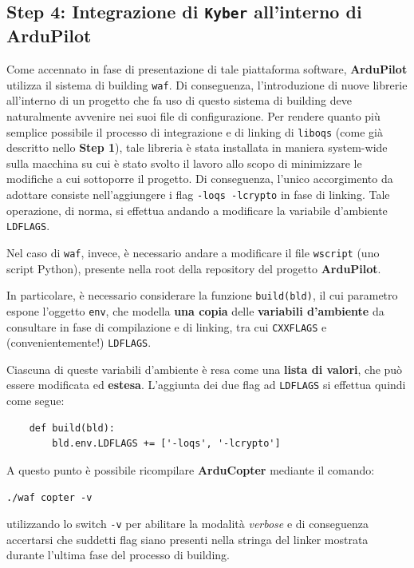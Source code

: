 \documentclass[a4paper, 12pt, oneside]{article}
\theoremstyle{definition}
\begin{document}
\subsection{Step 4: Integrazione di \texttt{Kyber} all'interno di ArduPilot}
Come accennato in fase di presentazione di tale piattaforma software, \textbf{ArduPilot} utilizza il sistema di building \texttt{waf}. Di conseguenza, l'introduzione di nuove librerie all'interno di un progetto che fa uso di questo sistema di building deve naturalmente avvenire nei suoi file di configurazione. Per rendere quanto più semplice possibile il processo di integrazione e di linking di \texttt{liboqs} (come già descritto nello \textbf{Step 1}), tale libreria è stata installata in maniera system-wide sulla macchina su cui è stato svolto il lavoro allo scopo di minimizzare le modifiche a cui sottoporre il progetto. Di conseguenza, l'unico accorgimento da adottare consiste nell'aggiungere i flag \texttt{-loqs -lcrypto} in fase di linking. Tale operazione, di norma, si effettua andando a modificare la variabile d'ambiente \texttt{LDFLAGS}.

Nel caso di \texttt{waf}, invece, è necessario andare a modificare il file \texttt{wscript} (uno script Python), presente nella root della repository del progetto \textbf{ArduPilot}.

In particolare, è necessario considerare la funzione \texttt{build(bld)}, il cui parametro espone l'oggetto \texttt{env}, che modella \textbf{una copia} delle \textbf{variabili d'ambiente} da consultare in fase di compilazione e di linking, tra cui \texttt{CXXFLAGS} e (convenientemente!) \texttt{LDFLAGS}.

Ciascuna di queste variabili d'ambiente è resa come una \textbf{lista di valori}, che può essere modificata ed \textbf{estesa}. L'aggiunta dei due flag ad \texttt{LDFLAGS} si effettua quindi come segue:

\begin{verbatim}
    def build(bld):
        bld.env.LDFLAGS += ['-loqs', '-lcrypto']
\end{verbatim}

A questo punto è possibile ricompilare \textbf{ArduCopter} mediante il comando:

\begin{center}
    \texttt{./waf copter -v}
\end{center}

utilizzando lo switch \texttt{-v} per abilitare la modalità \textit{verbose} e di conseguenza accertarsi che suddetti flag siano presenti nella stringa del linker mostrata durante l'ultima fase del processo di building.
\end{document}
